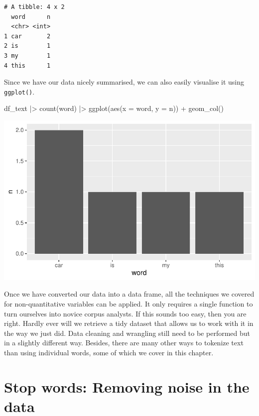 \documentclass[
  letterpaper,
  DIV=11,
  numbers=noendperiod]{scrreprt}
\newenvironment{Shaded}{\begin{snugshade}}{\end{snugshade}}
\newcommand{\AttributeTok}[1]{\textcolor[rgb]{0.40,0.45,0.13}{#1}}
\newcommand{\FunctionTok}[1]{\textcolor[rgb]{0.28,0.35,0.67}{#1}}
\newcommand{\NormalTok}[1]{\textcolor[rgb]{0.00,0.23,0.31}{#1}}
\newcommand{\SpecialCharTok}[1]{\textcolor[rgb]{0.37,0.37,0.37}{#1}}
\begin{document}
\begin{verbatim}
# A tibble: 4 x 2
  word      n
  <chr> <int>
1 car       2
2 is        1
3 my        1
4 this      1
\end{verbatim}

Since we have our data nicely summarised, we can also easily visualise
it using \texttt{ggplot()}.

\begin{Shaded}
\begin{Highlighting}[]
\NormalTok{df\_text }\SpecialCharTok{|\textgreater{}}
  \FunctionTok{count}\NormalTok{(word) }\SpecialCharTok{|\textgreater{}}
  \FunctionTok{ggplot}\NormalTok{(}\FunctionTok{aes}\NormalTok{(}\AttributeTok{x =}\NormalTok{ word,}
             \AttributeTok{y =}\NormalTok{ n)) }\SpecialCharTok{+}
  \FunctionTok{geom\_col}\NormalTok{()}
\end{Highlighting}
\end{Shaded}

\includegraphics{14_mixed_methods_files/figure-pdf/visualise-word-freq-1.pdf}

Once we have converted our data into a data frame, all the techniques we
covered for non-quantitative variables can be applied. It only requires
a single function to turn ourselves into novice corpus analysts. If this
sounds too easy, then you are right. Hardly ever will we retrieve a tidy
dataset that allows us to work with it in the way we just did. Data
cleaning and wrangling still need to be performed but in a slightly
different way. Besides, there are many other ways to tokenize text than
using individual words, some of which we cover in this chapter.

\section{Stop words: Removing noise in the
data}\label{stop-words-removing-noise-in-the-data}
\end{document}

